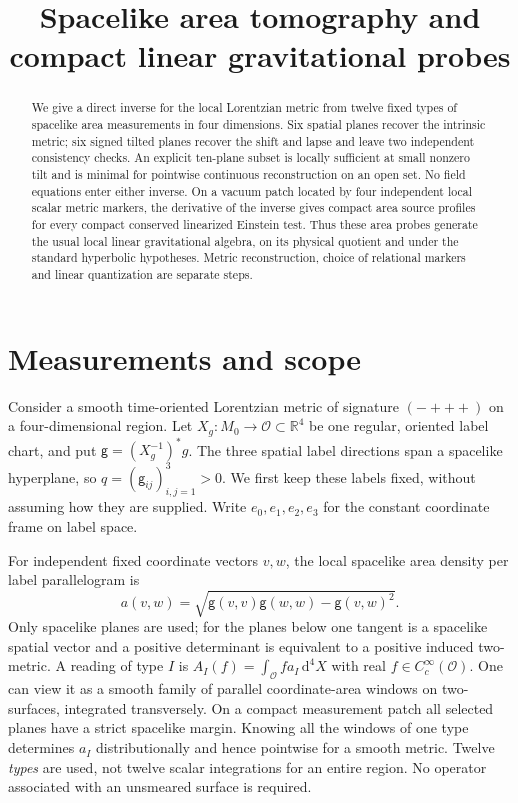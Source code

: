 \documentclass[11pt]{article}
\title{Spacelike area tomography and compact linear gravitational probes}
\author{}\date{}
\newcommand{\dd}{\mathrm d}\newcommand{\Lie}{\mathcal L}
\newcommand{\gmark}{\mathsf g}
\begin{document}
\maketitle
\begin{abstract}
We give a direct inverse for the local Lorentzian metric from twelve fixed types of spacelike area measurements in four dimensions. Six spatial planes recover the intrinsic metric; six signed tilted planes recover the shift and lapse and leave two independent consistency checks. An explicit ten-plane subset is locally sufficient at small nonzero tilt and is minimal for pointwise continuous reconstruction on an open set. No field equations enter either inverse. On a vacuum patch located by four independent local scalar metric markers, the derivative of the inverse gives compact area source profiles for every compact conserved linearized Einstein test. Thus these area probes generate the usual local linear gravitational algebra, on its physical quotient and under the standard hyperbolic hypotheses. Metric reconstruction, choice of relational markers and linear quantization are separate steps.
\end{abstract}

\section{Measurements and scope}
Consider a smooth time-oriented Lorentzian metric of signature \((-+++)\) on a four-dimensional region. Let \(X_g:M_0\to\mathcal O\subset\mathbb R^4\) be one regular, oriented label chart, and put \(\gmark=(X_g^{-1})^*g\). The three spatial label directions span a spacelike hyperplane, so \(q=(\gmark_{ij})_{i,j=1}^3>0\). We first keep these labels fixed, without assuming how they are supplied. Write \(e_0,e_1,e_2,e_3\) for the constant coordinate frame on label space.

For independent fixed coordinate vectors \(v,w\), the local spacelike area density per label parallelogram is
\begin{equation}
 a(v,w)=\sqrt{\gmark(v,v)\gmark(w,w)-\gmark(v,w)^2}.
 \label{area}
\end{equation}
Only spacelike planes are used; for the planes below one tangent is a spacelike spatial vector and a positive determinant is equivalent to a positive induced two-metric. A reading of type \(I\) is \(A_I(f)=\int_{\mathcal O} f a_I\,\dd^4X\) with real \(f\in C_c^\infty(\mathcal O)\). One can view it as a smooth family of parallel coordinate-area windows on two-surfaces, integrated transversely. On a compact measurement patch all selected planes have a strict spacelike margin. Knowing all the windows of one type determines \(a_I\) distributionally and hence pointwise for a smooth metric. Twelve \emph{types} are used, not twelve scalar integrations for an entire region. No operator associated with an unsmeared surface is required.
\end{document}
